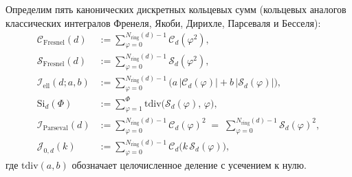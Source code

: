 \documentclass[11pt,a4paper]{article}
\theoremstyle{plain}
\theoremstyle{definition}
\begin{document}
Определим пять канонических дискретных кольцевых сумм (кольцевых аналогов классических интегралов Френеля, Якоби, Дирихле, Парсеваля и Бесселя):
\begin{align}
  \mathcal{C}_{\mathrm{Fresnel}}(d) &:= \sum_{\varphi=0}^{N_{\mathrm{ring}}(d)-1}\mathcal{C}_d(\varphi^2), \label{eq:def-fresnel-c} \\
  \mathcal{S}_{\mathrm{Fresnel}}(d) &:= \sum_{\varphi=0}^{N_{\mathrm{ring}}(d)-1}\mathcal{S}_d(\varphi^2), \label{eq:def-fresnel-s} \\
  \mathcal{I}_{\mathrm{ell}}(d; a, b) &:= \sum_{\varphi=0}^{N_{\mathrm{ring}}(d)-1}\bigl(a\,|\mathcal{C}_d(\varphi)| + b\,|\mathcal{S}_d(\varphi)|\bigr), \label{eq:def-elliptic} \\
  \mathrm{Si}_d(\Phi) &:= \sum_{\varphi=1}^{\Phi}\mathrm{tdiv}\bigl(\mathcal{S}_d(\varphi),\, \varphi\bigr), \label{eq:def-dirichlet} \\
  \mathcal{I}_{\mathrm{Parseval}}(d) &:= \sum_{\varphi=0}^{N_{\mathrm{ring}}(d)-1}\mathcal{C}_d(\varphi)^2 \;=\; \sum_{\varphi=0}^{N_{\mathrm{ring}}(d)-1}\mathcal{S}_d(\varphi)^2, \label{eq:def-parseval} \\
  \mathcal{J}_{0,d}(k) &:= \sum_{\varphi=0}^{N_{\mathrm{ring}}(d)-1}\mathcal{C}_d\bigl(k\,\mathcal{S}_d(\varphi)\bigr), \label{eq:def-bessel}
\end{align}
где $\mathrm{tdiv}(a, b)$ обозначает целочисленное деление с усечением к нулю.
\end{document}
